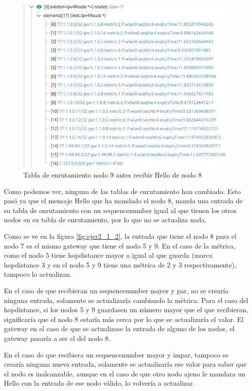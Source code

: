\begin{figure}[H]
    \centering
    \includegraphics[width=115mm, scale=0.75]{imaxes/dsdv/ejercicio2_4_1_nodo9.png}
    \caption{Tabla de enrutamiento nodo 9 antes recibir Hello de nodo 8}
    \label{fig:ejer2_4_4}
\end{figure}


Como podemos ver, ninguna de las tablas de enrutamiento han cambiado. Esto pasó ya que el mensaje Hello que ha mandado el nodo 8, manda una entrada de su tabla de enrutamiento con un sequencenumber igual al que tienen los otros nodos en su tabla de enrutamiento, por lo que no se actualiza nada.

Como se ve en la figura \ref{fig:ejer2_1_2}, la entrada que tiene el nodo 8 para el nodo 7 es el mismo gateway que tiene el nodo 5 y 9. En el caso de la métrica, como el nodo 5 tiene hopdistance mayor o igual al que guarda (marca hopdistance 3 y en el nodo 5 y 9 tiene una métrica de 2 y 3 respectivamente), tampoco lo actualizan. 

En el caso de que recibieran un sequencenumber mayor y par, no se crearía ninguna entrada, solamente se actualizaría cambiando la métrica. Para el caso del hopdistance, si los nodos 5 y 9 guardasen un número mayor que el que recibieran, significaría que el nodo 8 estaría más cerca por lo que se actualizaría el valor. El gateway en el caso de que se actualizase la entrada de alguno de los nodos, el gateway pasaría a ser el del nodo 8.

En el caso de que recibiera un sequencenumber mayor y impar, tampoco se crearía ninguna nueva entrada, solamente se actualizaría ese valor para saber que el nodo es inalcanzable, aunque en el caso de que otro nodo ajeno le mandara un Hello con la entrada de ese nodo válido, lo volvería a actualizar.


